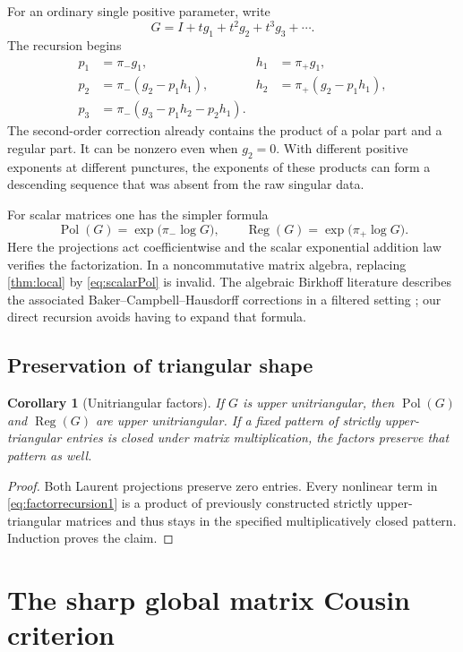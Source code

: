 \documentclass[11pt,letterpaper]{article}
\newtheorem{corollary}[corollary]{Corollary}
\theoremstyle{definition}
\theoremstyle{remark}
\newcommand{\Pol}{\operatorname{Pol}}
\newcommand{\Reg}{\operatorname{Reg}}
\numberwithin{equation}{section}
\begin{document}
For an ordinary single positive parameter, write
\[
 G=I+t g_1+t^2g_2+t^3g_3+\cdots.
\]
The recursion begins
\begin{align*}
 p_1&=\pi_-g_1,& h_1&=\pi_+g_1,\\
 p_2&=\pi_-(g_2-p_1h_1),&
 h_2&=\pi_+(g_2-p_1h_1),\\
 p_3&=\pi_-(g_3-p_1h_2-p_2h_1).&&
\end{align*}
The second-order correction already contains the product of a polar part and a regular part. It can be nonzero even when $g_2=0$. With different positive exponents at different punctures, the exponents of these products can form a descending sequence that was absent from the raw singular data.

For scalar matrices one has the simpler formula
\begin{equation}\label{eq:scalarPol}
 \Pol(G)=\exp\bigl(\pi_-\log G\bigr),\qquad
 \Reg(G)=\exp\bigl(\pi_+\log G\bigr).
\end{equation}
Here the projections act coefficientwise and the scalar exponential addition law verifies the factorization. In a noncommutative matrix algebra, replacing \cref{thm:local} by \eqref{eq:scalarPol} is invalid. The algebraic Birkhoff literature describes the associated Baker--Campbell--Hausdorff corrections in a filtered setting \cite{EFGK,EFMP}; our direct recursion avoids having to expand that formula.

\subsection{Preservation of triangular shape}

\begin{corollary}[Unitriangular factors]\label{cor:unitriangular}
If $G$ is upper unitriangular, then $\Pol(G)$ and $\Reg(G)$ are upper unitriangular. If a fixed pattern of strictly upper-triangular entries is closed under matrix multiplication, the factors preserve that pattern as well.
\end{corollary}

\begin{proof}
Both Laurent projections preserve zero entries. Every nonlinear term in \eqref{eq:factorrecursion1} is a product of previously constructed strictly upper-triangular matrices and thus stays in the specified multiplicatively closed pattern. Induction proves the claim.
\end{proof}

\section{The sharp global matrix Cousin criterion}\label{sec:global}
\end{document}
